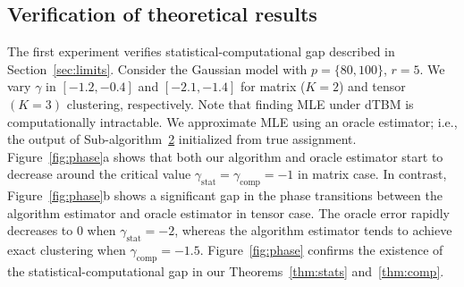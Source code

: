 \documentclass[lettersize,onecolumn,journal]{IEEEtran}
\theoremstyle{definition}
\theoremstyle{definition}
\begin{document}
 


\subsection{Verification of theoretical results}\label{subsec:num_theory}

The first experiment verifies  statistical-computational gap described in Section~\ref{sec:limits}. Consider the Gaussian model with $p = \{80, 100\}$, $r = 5$. We vary $\gamma $ in $ [-1.2, -0.4]$ and $[-2.1, -1.4]$ for matrix ($K=2$) and tensor $(K = 3)$ clustering, respectively. Note that finding MLE under dTBM is computationally intractable. We approximate MLE using an oracle estimator; i.e., the output of Sub-algorithm~\hyperref[alg:main]{2} initialized from true assignment. Figure~\ref{fig:phase}a shows that both our algorithm and oracle estimator start to decrease around the critical value $\gamma_{\text{stat}}  = \gamma_{\text{comp}}  = -1$ in matrix case. In contrast, Figure~\ref{fig:phase}b shows a significant gap in the phase transitions between the algorithm estimator and oracle estimator in tensor case. The oracle error rapidly decreases to 0 when $\gamma_{\text{stat}} = -2$, whereas the algorithm estimator tends to achieve exact clustering when $\gamma_{\text{comp}} = -1.5$. Figure~\ref{fig:phase} confirms the existence of the statistical-computational gap in our Theorems~\ref{thm:stats} and~\ref{thm:comp}. 
\end{document}
